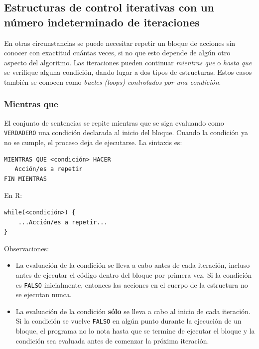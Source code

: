 \documentclass[
]{book}
\providecommand{\tightlist}{%
  \setlength{\itemsep}{0pt}\setlength{\parskip}{0pt}}
\begin{document}
\hypertarget{estructuras-de-control-iterativas-con-un-nuxfamero-indeterminado-de-iteraciones}{%
\subsection{Estructuras de control iterativas con un número indeterminado de iteraciones}\label{estructuras-de-control-iterativas-con-un-nuxfamero-indeterminado-de-iteraciones}}

En otras circunstancias se puede necesitar repetir un bloque de acciones sin conocer con exactitud cuántas veces, si no que esto depende de algún otro aspecto del algoritmo. Las iteraciones pueden continuar \emph{mientras que} o \emph{hasta que} se verifique alguna condición, dando lugar a dos tipos de estructuras. Estos casos también se conocen como \emph{bucles (loops) controlados por una condición}.

\hypertarget{mientras-que}{%
\subsubsection{Mientras que}\label{mientras-que}}

El conjunto de sentencias se repite mientras que se siga evaluando como \texttt{VERDADERO} una condición declarada al inicio del bloque. Cuando la condición ya no se cumple, el proceso deja de ejecutarse. La sintaxis es:

\begin{verbatim}
MIENTRAS QUE <condición> HACER
   Acción/es a repetir
FIN MIENTRAS
\end{verbatim}

En R:

\begin{verbatim}
while(<condición>) {
    ...Acción/es a repetir...
}
\end{verbatim}

Observaciones:

\begin{itemize}
\tightlist
\item
  La evaluación de la condición se lleva a cabo antes de cada iteración, incluso antes de ejecutar el código dentro del bloque por primera vez. Si la condición es \texttt{FALSO} inicialmente, entonces las acciones en el cuerpo de la estructura no se ejecutan nunca.
\item
  La evaluación de la condición \textbf{sólo} se lleva a cabo al inicio de cada iteración. Si la condición se vuelve \texttt{FALSO} en algún punto durante la ejecución de un bloque, el programa no lo nota hasta que se termine de ejecutar el bloque y la condición sea evaluada antes de comenzar la próxima iteración.
\end{itemize}
\end{document}

